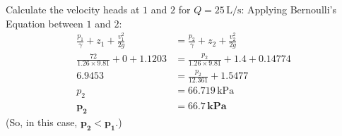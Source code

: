 \documentclass[10pt]{amsart}
\begin{document}
\begin{minipage}[t]{0.52\textwidth}
	\parb
	Calculate the velocity heads at $1$ and $2$ for $Q=25\,\text{L/s}$:
	\parb
	Applying Bernoulli's Equation between $1$ and $2$:
	\begin{align*}
		\frac{p_1}{\gamma} + z_1 + \frac{v_1^2}{2g} & = \frac{p_2}{\gamma} + z_2 + \frac{v_2^2}{2g} \\
		\frac{72}{1.26\times9.81} + 0 + 1.1203      & = \frac{p_2}{1.26\times9.81} + 1.4 + 0.14774  \\
		6.9453                                      & = \frac{p_2}{12.361} + 1.5477                 \\
		p_2                                         & = 66.719\,\text{kPa}                          \\
		\bm{p_2}                                    & \bm{= 66.7\,\textbf{kPa}}                     
	\end{align*}
	\parb
	\centering
	(So, in this case, $\bm{p_2<p_1}$.)
	
\end{minipage}

\end{document}
